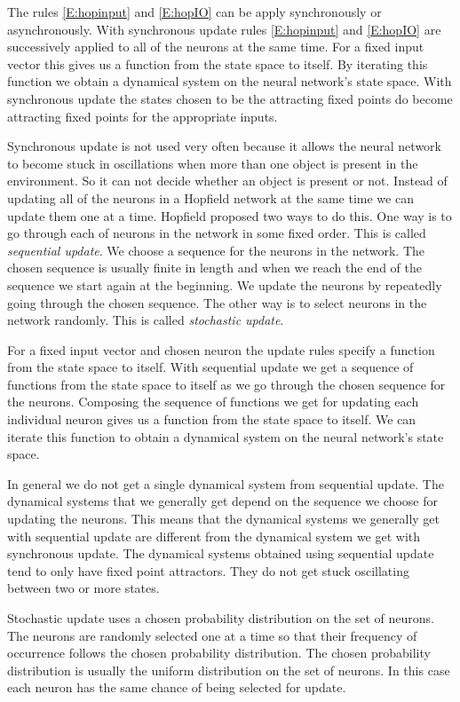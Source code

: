    The rules \eqref{E:hopinput} and \eqref{E:hopIO} can be apply synchronously
or asynchronously.  With synchronous update rules \eqref{E:hopinput} and 
\eqref{E:hopIO} are successively applied to all of the neurons at the same 
time.  For a fixed input vector this gives us a function from the state space 
to itself.  By iterating this function we obtain a dynamical system on the 
neural network's state space.  With synchronous update the states chosen to be
the attracting fixed points do become attracting fixed points for the 
appropriate inputs.

   Synchronous update is not used very often because it allows the neural
network to become stuck in oscillations when more than one object is present 
in the environment.  So it can not decide whether an object is present or not.
Instead of updating all of the neurons in a Hopfield network at the same time 
we can update them one at a time.  Hopfield proposed two ways to do this.  One 
way is to go through each of neurons in the network in some fixed order.  This 
is called \emph{sequential update}.  We choose a sequence for the neurons in 
the network.  The chosen sequence is usually finite in length and when we reach 
the end of the sequence we start again at the beginning.  We update the neurons 
by repeatedly going through the chosen sequence.  The other way is to select 
neurons in the network randomly.  This is called \emph{stochastic update}.

   For a fixed input vector and chosen neuron the update rules specify a 
function from the state space to itself.  With sequential update we get a 
sequence of functions from the state space to itself as we go through the 
chosen sequence for the neurons.  Composing the sequence of functions we get 
for updating each individual neuron gives us a function from the state space to 
itself.  We can iterate this function to obtain a dynamical system on the 
neural network's state space.

   In general we do not get a single dynamical system from sequential update.
The dynamical systems that we generally get depend on the sequence we choose
for updating the neurons.  This means that the dynamical systems we generally
get with sequential update are different from the dynamical system we get with
synchronous update.  The dynamical systems obtained using sequential update 
tend to only have fixed point attractors.  They do not get stuck oscillating 
between two or more states.

   Stochastic update uses a chosen probability distribution on the set of 
neurons.  The neurons are randomly selected one at a time so that their 
frequency of occurrence follows the chosen probability distribution.  The
chosen probability distribution is usually the uniform distribution on the 
set of neurons.  In this case each neuron has the same chance of being selected
for update. 


